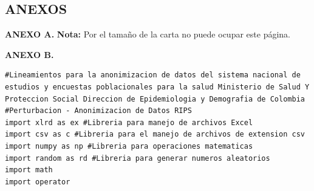\documentclass[a4paper,openright,12pt]{book}
\theoremstyle{definition}
\theoremstyle{remark}
\begin{document}
\begin{center}
 \chapter{ANEXOS}\label{cap.anexos}
\end{center}
\textbf{ANEXO A.}
 \textbf{Nota:} Por el tamaño de la carta no puede ocupar este página.
	\begin{center}
     
	\end{center}  
\textbf{ANEXO B.} 
    \begin{verbatim}
#Lineamientos para la anonimizacion de datos del sistema nacional de estudios y encuestas poblacionales para la salud Ministerio de Salud Y Proteccion Social Direccion de Epidemiologia y Demografia de Colombia
#Perturbacion - Anonimizacion de Datos RIPS
import xlrd as ex #Libreria para manejo de archivos Excel
import csv as c #Libreria para el manejo de archivos de extension csv
import numpy as np #Libreria para operaciones matematicas
import random as rd #Libreria para generar numeros aleatorios
import math
import operator


\end{verbatim}
\end{document}
